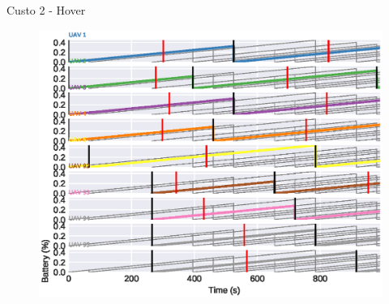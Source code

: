 \begin{frame}{Custo 2 - Hover}
            \begin{figure}[!htb]
                 \includegraphics[width=\textwidth]{custo_2/uav_hover_acum_all.eps}
             \end{figure}
        \end{frame}